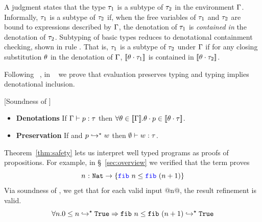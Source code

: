 %
A judgment  states
that the type $\tau_1$ is a subtype of %
$\tau_2$ in the environment $\Gamma$.
%
%
Informally, $\tau_1$ is a subtype of $\tau_2$ if, when
the free variables of $\tau_1$ and $\tau_2$
are bound to expressions described by $\Gamma$,
the denotation of $\tau_1$
is \emph{contained in} the denotation of $\tau_2$.
%
Subtyping of basic types reduces to denotational
containment checking, shown in rule \rsubbasecore.
%
That is, $\tau_1$ is a subtype of $\tau_2$ under $\Gamma$
if for any closing substitution $\theta$ in the denotation
of $\Gamma$,
$\interp{\applysub{\sto}{\typ_1}}$ is contained in
$\interp{\applysub{\sto}{\typ_2}}$.

%
Following \undeclang~\citep{Vazou14},
in ~\citet{appendix}
we prove that evaluation preserves typing
and typing implies denotational
inclusion.
%
\begin{theorem}{[Soundness of \corelan]}\label{thm:safety}
\begin{itemize}
\item\textbf{Denotations}
If $\Gamma \vdash p : \tau$ then
$\forall \theta\in [\![\Gamma]\!]. {\theta} \cdot {\ensuremath{p}}  \in [\![{\theta} \cdot {\ensuremath{\tau}} ]\!]$.
\item\textbf{Preservation}
If \hastype{\emptyset}{\prog}{\typ}
       and ${p}\hookrightarrow^{\star}{w}$ then $\emptyset \vdash w : \tau$.
\end{itemize}
\end{theorem}

Theorem~\ref{thm:safety} lets us interpret well
typed programs as proofs of propositions.
%
For example, in \S~\ref{sec:overview} we verified
that the term \fibincrname proves
$${\tfun{n}{\tnat}{\ttref{\fib{n} \leq \fib{(n+1)}}}}$$
%
Via soundness of \corelan, we get that for each valid input @n@,
the result refinement is valid.
$$
\forall n. \evalsto{0 \leq n}{\etrue} \Rightarrow \evalsto{\texttt{fib}\ n \leq \texttt{fib}\ {(n+1)}}{\etrue}
$$
